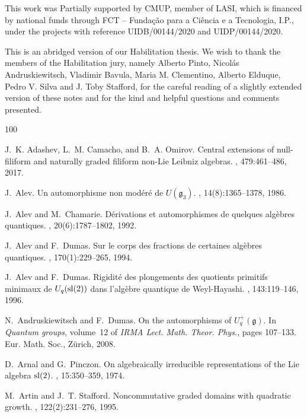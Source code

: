 \documentclass{commat}
\begin{document}
This work was Partially supported by CMUP, member of LASI, which is financed by national funds through FCT -- Funda\c c\~ao para a Ci\^encia e a Tecnologia, I.P., under the projects with reference UIDB/00144/2020 and UIDP/00144/2020.


This is an abridged version of our Habilitation thesis. We wish to thank the members of the Habilitation jury, namely Alberto Pinto, Nicolás Andruskiewitsch, Vladimir Bavula, Maria M. Clementino, Alberto Elduque, Pedro V. Silva and J. Toby Stafford, for the careful reading of a slightly extended version of these notes and for the kind and helpful questions and comments presented.



\def\cprime{$'$} \def\cprime{$'$} \def\cprime{$'$}
\begin{thebibliography}{100}

J.~K. Adashev, L.~M. Camacho, and B.~A. Omirov.
\newblock Central extensions of null-filiform and naturally graded filiform
  non-{L}ie {L}eibniz algebras.
, 479:461--486, 2017.

J.~Alev.
\newblock Un automorphisme non mod\'{e}r\'{e} de {${U}({\mathfrak g}_3)$}.
, 14(8):1365--1378, 1986.

J.~Alev and M.~Chamarie.
\newblock D\'{e}rivations et automorphismes de quelques alg\`ebres quantiques.
, 20(6):1787--1802, 1992.

J.~Alev and F.~Dumas.
\newblock Sur le corps des fractions de certaines alg\`ebres quantiques.
, 170(1):229--265, 1994.

J.~Alev and F.~Dumas.
\newblock Rigidit\'e des plongements des quotients primitifs minimaux de {$U\sb
  q({\rm sl}(2))$} dans l'alg\`ebre quantique de {W}eyl-{H}ayashi.
, 143:119--146, 1996.

N.~Andruskiewitsch and F.~Dumas.
\newblock On the automorphisms of {$U_q^+(\mathfrak g)$}.
\newblock In {\em Quantum groups}, volume~12 of {\em IRMA Lect. Math. Theor.
  Phys.}, pages 107--133. Eur. Math. Soc., Z\"{u}rich, 2008.

D.~Arnal and G.~Pinczon.
\newblock On algebraically irreducible representations of the {L}ie algebra
  {${\rm sl}(2)$}.
, 15:350--359, 1974.

M.~Artin and J.~T. Stafford.
\newblock Noncommutative graded domains with quadratic growth.
, 122(2):231--276, 1995.


\end{thebibliography}
\end{document}
